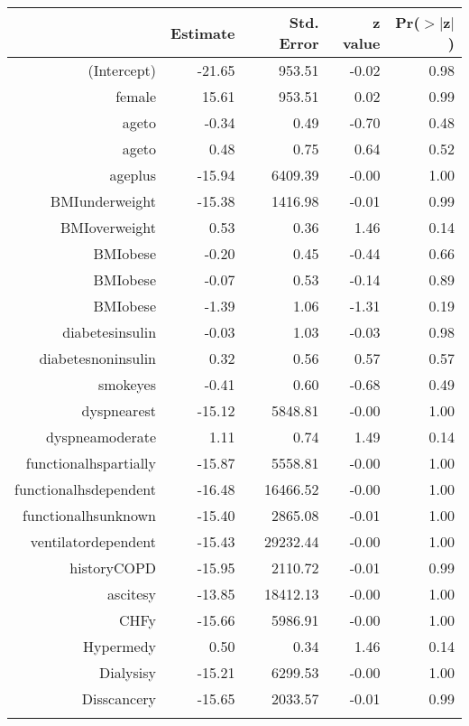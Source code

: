 \bigskip\bigskip
\centering
\begin{tabular}{rrrrr}
  \hline
 & Estimate & Std. Error & z value & Pr($>$$|$z$|$) \\ 
  \hline
(Intercept) & -21.65 & 953.51 & -0.02 & 0.98 \\ 
  female & 15.61 & 953.51 & 0.02 & 0.99 \\ 
  age\-65\-to\-74 & -0.34 & 0.49 & -0.70 & 0.48 \\ 
  age\-75\-to\-84 & 0.48 & 0.75 & 0.64 & 0.52 \\ 
  age\-85\-plus & -15.94 & 6409.39 & -0.00 & 1.00 \\ 
  BMI\-underweight & -15.38 & 1416.98 & -0.01 & 0.99 \\ 
  BMI\-overweight & 0.53 & 0.36 & 1.46 & 0.14 \\ 
  BMI\-obese\-1 & -0.20 & 0.45 & -0.44 & 0.66 \\ 
  BMI\-obese\-2 & -0.07 & 0.53 & -0.14 & 0.89 \\ 
  BMI\-obese\-3 & -1.39 & 1.06 & -1.31 & 0.19 \\ 
  diabetes\-insulin & -0.03 & 1.03 & -0.03 & 0.98 \\ 
  diabetes\-noninsulin & 0.32 & 0.56 & 0.57 & 0.57 \\ 
  smoke\-yes & -0.41 & 0.60 & -0.68 & 0.49 \\ 
  dyspnea\-rest & -15.12 & 5848.81 & -0.00 & 1.00 \\ 
  dyspnea\-moderate & 1.11 & 0.74 & 1.49 & 0.14 \\ 
  functional\-hs\-partially & -15.87 & 5558.81 & -0.00 & 1.00 \\ 
  functional\-hs\-dependent & -16.48 & 16466.52 & -0.00 & 1.00 \\ 
  functional\-hs\-unknown & -15.40 & 2865.08 & -0.01 & 1.00 \\ 
  ventilator\-dependent & -15.43 & 29232.44 & -0.00 & 1.00 \\ 
  history\-COPD & -15.95 & 2110.72 & -0.01 & 0.99 \\ 
  ascites\-y & -13.85 & 18412.13 & -0.00 & 1.00 \\ 
  CHF\-y & -15.66 & 5986.91 & -0.00 & 1.00 \\ 
  Hyper\-med\-y & 0.50 & 0.34 & 1.46 & 0.14 \\ 
  Dialysis\-y & -15.21 & 6299.53 & -0.00 & 1.00 \\ 
  Diss\-cancer\-y & -15.65 & 2033.57 & -0.01 & 0.99 \\ 
$$
\end{tabular}
